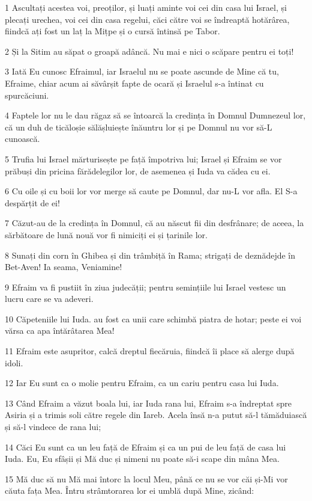 \par 1 Ascultați acestea voi, preoților, și luați aminte voi cei din casa lui Israel, și plecați urechea, voi cei din casa regelui, căci către voi se îndreaptă hotărârea, fiindcă ați fost un laț la Mițpe și o cursă întinsă pe Tabor.
\par 2 Și la Sitim au săpat o groapă adâncă. Nu mai e nici o scăpare pentru ei toți!
\par 3 Iată Eu cunosc Efraimul, iar Israelul nu se poate ascunde de Mine că tu, Efraime, chiar acum ai săvârșit fapte de ocară și Israelul s-a întinat cu spurcăciuni.
\par 4 Faptele lor nu le dau răgaz să se întoarcă la credința în Domnul Dumnezeul lor, că un duh de ticăloșie sălășluiește înăuntru lor și pe Domnul nu vor să-L cunoască.
\par 5 Trufia lui Israel mărturisește pe față împotriva lui; Israel și Efraim se vor prăbuși din pricina fărădelegilor lor, de asemenea și Iuda va cădea cu ei.
\par 6 Cu oile și cu boii lor vor merge să caute pe Domnul, dar nu-L vor afla. El S-a despărțit de ei!
\par 7 Căzut-au de la credința în Domnul, că au născut fii din desfrânare; de aceea, la sărbătoare de lună nouă vor fi nimiciți ei și țarinile lor.
\par 8 Sunați din corn în Ghibea și din trâmbiță în Rama; strigați de deznădejde în Bet-Aven! Ia seama, Veniamine!
\par 9 Efraim va fi pustiit în ziua judecății; pentru semințiile lui Israel vestesc un lucru care se va adeveri.
\par 10 Căpeteniile lui Iuda. au fost ca unii care schimbă piatra de hotar; peste ei voi vărsa ca apa întărâtarea Mea!
\par 11 Efraim este asupritor, calcă dreptul fiecăruia, fiindcă îi place să alerge după idoli.
\par 12 Iar Eu sunt ca o molie pentru Efraim, ca un cariu pentru casa lui Iuda.
\par 13 Când Efraim a văzut boala lui, iar Iuda rana lui, Efraim s-a îndreptat spre Asiria și a trimis soli către regele din Iareb. Acela însă n-a putut să-l tămăduiască și să-l vindece de rana lui;
\par 14 Căci Eu sunt ca un leu față de Efraim și ca un pui de leu față de casa lui Iuda. Eu, Eu sfâșii și Mă duc și nimeni nu poate să-i scape din mâna Mea.
\par 15 Mă duc să nu Mă mai întorc la locul Meu, până ce nu se vor căi și-Mi vor căuta fața Mea. Întru strâmtorarea lor ei umblă după Mine, zicând:

